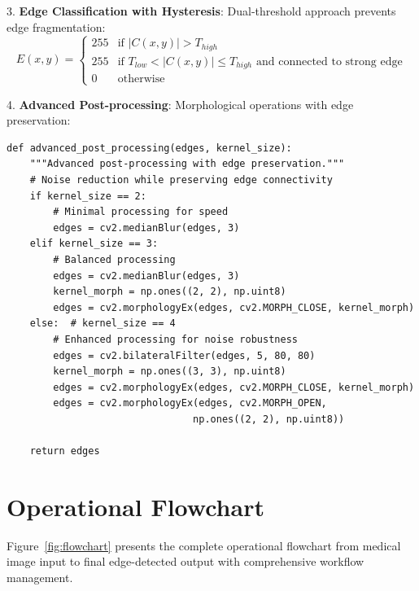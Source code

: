 \documentclass[conference]{IEEEtran}
\begin{document}
3. \textbf{Edge Classification with Hysteresis}: Dual-threshold approach prevents edge fragmentation:
   \begin{equation}
   E(x,y) = \begin{cases} 
   255 & \text{if } |C(x,y)| > T_{high} \\
   255 & \text{if } T_{low} < |C(x,y)| \leq T_{high} \text{ and connected to strong edge} \\
   0 & \text{otherwise}
   \end{cases}
   \end{equation}

4. \textbf{Advanced Post-processing}: Morphological operations with edge preservation:

\begin{lstlisting}[caption={Advanced post-processing for edge preservation}]
def advanced_post_processing(edges, kernel_size):
    """Advanced post-processing with edge preservation."""
    # Noise reduction while preserving edge connectivity
    if kernel_size == 2:
        # Minimal processing for speed
        edges = cv2.medianBlur(edges, 3)
    elif kernel_size == 3:
        # Balanced processing
        edges = cv2.medianBlur(edges, 3)
        kernel_morph = np.ones((2, 2), np.uint8)
        edges = cv2.morphologyEx(edges, cv2.MORPH_CLOSE, kernel_morph)
    else:  # kernel_size == 4
        # Enhanced processing for noise robustness
        edges = cv2.bilateralFilter(edges, 5, 80, 80)
        kernel_morph = np.ones((3, 3), np.uint8)
        edges = cv2.morphologyEx(edges, cv2.MORPH_CLOSE, kernel_morph)
        edges = cv2.morphologyEx(edges, cv2.MORPH_OPEN, 
                                np.ones((2, 2), np.uint8))
    
    return edges
\end{lstlisting}

\section{Operational Flowchart}

Figure~\ref{fig:flowchart} presents the complete operational flowchart from medical image input to final edge-detected output with comprehensive workflow management.
\end{document}
